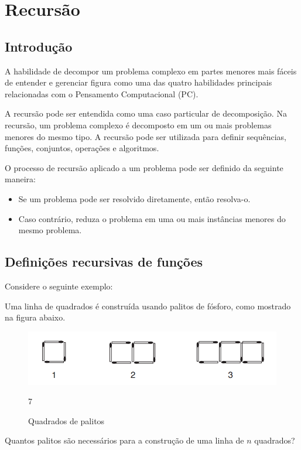 \chapter[Recursão]{Recursão}

\section{Introdução}\label{sec1.1}



A habilidade de decompor um problema complexo em partes menores mais fáceis de entender e gerenciar figura como uma das quatro habilidades principais relacionadas com o Pensamento Computacional (PC). 

A recursão pode ser entendida como uma caso particular de decomposição. Na recursão, um problema complexo é decomposto em um ou mais problemas menores do mesmo tipo. A recursão pode ser utilizada para definir sequências, funções, conjuntos, operações e algoritmos.  

O processo de recursão aplicado a um problema pode ser definido da seguinte maneira:

\begin{itemize}
    \item Se um problema pode ser resolvido diretamente, então resolva-o.
    \item Caso contrário, reduza o problema em uma ou mais instâncias menores do mesmo problema.
\end{itemize}



\section{Definições recursivas de funções}\label{sec1.2}

Considere o seguinte exemplo: 

\begin{exemplo}
Uma linha de quadrados é construída usando palitos de fósforo, como mostrado na figura abaixo.


\begin{figure}[htbp]
\centering
\includegraphics[width=.9\textwidth]{images/fosforos.png}
\label{fig::palitos}
\caption{Quadrados de palitos} 
7

\end{figure}

Quantos palitos são necessários para a construção de uma linha de $n$ quadrados? 

\end{exemplo}

